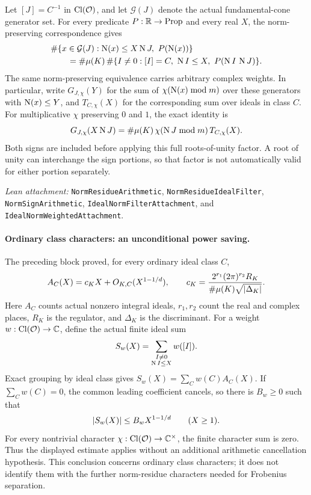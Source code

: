 Let $[J]=C^{-1}$ in $\operatorname{Cl}(\mathcal O)$, and let $\mathcal G(J)$ denote the
actual fundamental-cone generator set. For every predicate $P:\mathbb R\to\mathrm{Prop}$
and every real $X$, the norm-preserving correspondence gives
\begin{align*}
 &\#\{x\in\mathcal G(J):\operatorname N(x)\leq X\operatorname N J,\ P(\operatorname N(x))\}\\
 &\qquad=\#\mu(K)\,
 \#\{I\ne0:[I]=C,\ \operatorname N I\leq X,\ P(\operatorname N I\,\operatorname N J)\}.
\end{align*}
The same norm-preserving equivalence carries arbitrary complex weights.
In particular, write $G_{J,\chi}(Y)$ for the sum of
$\chi(\operatorname N(x)\bmod m)$ over these generators with $\operatorname N(x)\leq Y$, and
$T_{C,\chi}(X)$ for the corresponding sum over ideals in class $C$.
For multiplicative $\chi$ preserving $0$ and $1$, the exact identity is
\begin{equation}\label{eq:weighted-torsion}
 G_{J,\chi}(X\operatorname N J)
 =\#\mu(K)\,\chi(\operatorname N J\bmod m)\,T_{C,\chi}(X).
\end{equation}
Both signs are included before applying this full roots-of-unity factor.
A root of unity can interchange the sign portions, so that factor is not
automatically valid for either portion separately.

\smallskip
\noindent\emph{Lean attachment:}
\nolinkurl{NormResidueArithmetic}, \nolinkurl{NormResidueIdealFilter},
\nolinkurl{NormSignArithmetic}, \nolinkurl{IdealNormFilterAttachment}, and
\nolinkurl{IdealNormWeightedAttachment}.

\newpage
\paragraph{Ordinary class characters: an unconditional power saving.}
The preceding block proved, for every ordinary ideal class $C$,
\[
 A_C(X)=c_KX+O_{K,C}(X^{1-1/d}),\qquad
 c_K=\frac{2^{r_1}(2\pi)^{r_2}R_K}{\#\mu(K)\sqrt{\lvert \Delta_K\rvert}}.
\]
Here $A_C$ counts actual nonzero integral ideals, $r_1,r_2$ count the real
and complex places, $R_K$ is the regulator, and $\Delta_K$ is the discriminant. For a weight
$w:\operatorname{Cl}(\mathcal O)\to\mathbb C$, define the actual finite ideal sum
\[
 S_w(X)=\sum_{\substack{I\ne0\\\operatorname N I\leq X}}w([I]).
\]
Exact grouping by ideal class gives $S_w(X)=\sum_C w(C)A_C(X)$.
If $\sum_Cw(C)=0$, the common leading coefficient cancels, so there is
$B_w\geq0$ such that
\[
 \lvert S_w(X)\rvert\leq B_wX^{1-1/d}\qquad(X\geq1).
\]
For every nontrivial character $\chi:\operatorname{Cl}(\mathcal O)\to\mathbb C^{\times}$,
the finite character sum is zero. Thus the displayed estimate applies
without an additional arithmetic cancellation hypothesis.
This conclusion concerns ordinary class characters; it does not identify
them with the further norm-residue characters needed for Frobenius separation.


